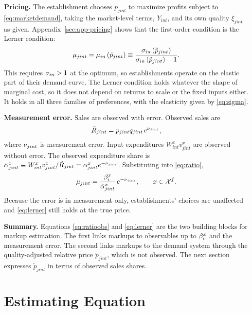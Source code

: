 \textbf{Pricing.}
The establishment chooses $p_{jint}$ to maximize profits subject to \eqref{eq:marketdemand}, taking the market-level terms, $Y_{int}$, and its own quality $\xi_{jint}$ as given.
Appendix~\ref{sec:app-pricing} shows that the first-order condition is the Lerner condition:
\begin{equation}\label{eq:lerner}
	\mu_{jint} = \mu_{in}\left(\check{p}_{jint}\right) \equiv \frac{\sigma_{in}\left(\check{p}_{jint}\right)}{\sigma_{in}\left(\check{p}_{jint}\right) - 1}.
\end{equation}
This requires $\sigma_{in} > 1$ at the optimum, so establishments operate on the elastic part of their demand curve.
The Lerner condition holds whatever the shape of marginal cost, so it does not depend on returns to scale or the fixed inputs either.
It holds in all three families of preferences, with the elasticity given by \eqref{eq:sigma}.

\textbf{Measurement error.}
Sales are observed with error.
Observed sales are
\begin{equation}\label{eq:obssales}
	\tilde{R}_{jint} = p_{jint} q_{jint} \, e^{\nu_{jint}},
\end{equation}
where $\nu_{jint}$ is measurement error.
Input expenditures $W^x_{int} v^x_{jint}$ are observed without error.
The observed expenditure share is $\tilde{\alpha}^x_{jint} \equiv W^x_{int} v^x_{jint}/\tilde{R}_{jint} = \alpha^x_{jint} e^{-\nu_{jint}}$.
Substituting into \eqref{eq:ratio},
\begin{equation}\label{eq:ratioobs}
	\mu_{jint} = \frac{\beta^x_i}{\tilde{\alpha}^x_{jint}} \, e^{-\nu_{jint}}, \qquad x \in {\cal X}^f.
\end{equation}
Because the error is in measurement only, establishments' choices are unaffected and \eqref{eq:lerner} still holds at the true price.

\textbf{Summary.}
Equations \eqref{eq:ratioobs} and \eqref{eq:lerner} are the two building blocks for markup estimation.
The first links markups to observables up to $\beta^x_i$ and the measurement error.
The second links markups to the demand system through the quality-adjusted relative price $\check{p}_{jint}$, which is not observed.
The next section expresses $\check{p}_{jint}$ in terms of observed sales shares.



\section{Estimating Equation}\label{sec:estequ}

